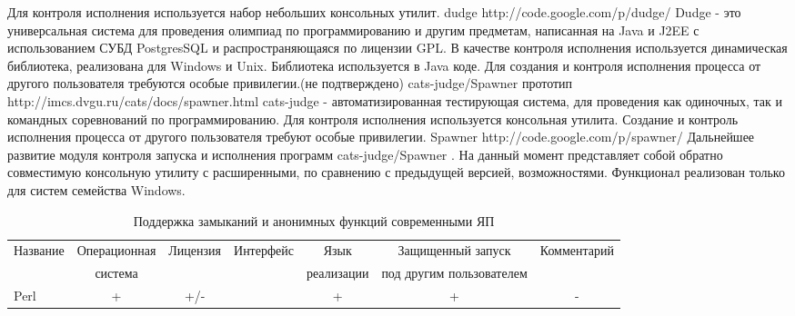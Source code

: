 \documentclass{imcs}
\begin{document}
Для контроля исполнения используется набор небольших консольных утилит.
dudge http://code.google.com/p/dudge/
Dudge - это универсальная система для проведения олимпиад по программированию и другим предметам, написанная на Java и J2EE с использованием СУБД PostgresSQL и распространяющаяся по лицензии GPL. 
В качестве контроля исполнения используется динамическая библиотека, реализована для Windows и Unix. Библиотека используется в Java коде. Для создания и контроля исполнения процесса от другого пользователя требуются особые привилегии.(не подтверждено)
cats-judge/Spawner прототип http://imcs.dvgu.ru/cats/docs/spawner.html
cats-judge - автоматизированная тестирующая система, для проведения как одиночных, так и командных соревнований по программированию.
Для контроля исполнения используется консольная утилита. Создание и контроль исполнения процесса от другого пользователя требуют особые привилегии.
Spawner http://code.google.com/p/spawner/
Дальнейшее развитие модуля контроля запуска и исполнения программ cats-judge/Spawner .
На данный момент представляет собой обратно совместимую консольную утилиту с расширенными, по сравнению с предыдущей версией, возможностями.
Функционал реализован только для систем семейства Windows.

\begin{landscape}
\begin{table}[h!]
\begin{center}
\begin{tabular}{|l|c|c|c|c|c|c|}
\hline
  Название   &  Операционная  &  Лицензия  &  Интерфейс  &  Язык	 		&  Защищенный запуск 	  & Комментарий \\
         	&  система    	 &      		  &  	   		&  реализации   	& под другим пользователем &	           \\
\hline
 Perl    &  +          &  +/-        &             &  +          &  +   &   -    \\
\hline
\end{tabular}
\caption{Поддержка замыканий и анонимных функций современными ЯП}\label{tab:wsi_diff_rel}
\end{center}
\end{table}
\end{landscape}
\end{document}

